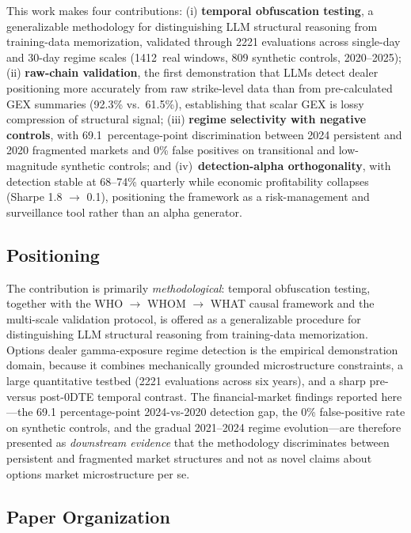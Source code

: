 \documentclass[jrfm,article,accept,moreauthors,pdftex]{Definitions/mdpi}
\begin{document}
This work makes four contributions: (i) \textbf{temporal obfuscation testing}, a generalizable methodology for distinguishing LLM structural reasoning from training-data memorization, validated through 2221 evaluations across single-day and 30-day regime scales (1412~real windows, 809 synthetic controls, 2020--2025); (ii) \textbf{raw-chain validation}, the first demonstration that LLMs detect dealer positioning more accurately from raw strike-level data than from pre-calculated GEX summaries (92.3\% vs.\ 61.5\%), establishing that scalar GEX is lossy compression of structural signal; (iii) \textbf{regime selectivity with negative controls}, with 69.1~percentage-point discrimination between 2024 persistent and 2020 fragmented markets and 0\% false positives on transitional and low-magnitude synthetic controls; and (iv)~\textbf{detection-alpha orthogonality}, with detection stable at 68--74\% quarterly while economic profitability collapses (Sharpe 1.8 $\rightarrow$ 0.1), positioning the framework as a risk-management and surveillance tool rather than an alpha generator.

\subsection{Positioning}
\label{sec:introduction:positioning}

The contribution is primarily \textit{methodological}: temporal obfuscation testing, together with the WHO $\rightarrow$ WHOM $\rightarrow$ WHAT causal framework and the multi-scale validation protocol, is offered as a generalizable procedure for distinguishing LLM structural reasoning from training-data memorization. Options dealer gamma-exposure regime detection is the empirical demonstration domain, because it combines mechanically grounded microstructure constraints, a large quantitative testbed (2221 evaluations across six years), and a sharp pre- versus post-0DTE temporal contrast. The financial-market findings reported here---the 69.1 percentage-point 2024-vs-2020 detection gap, the 0\% false-positive rate on synthetic controls, and the gradual 2021--2024 regime evolution---are therefore presented as \textit{downstream evidence} that the methodology discriminates between persistent and fragmented market structures and not as novel claims about options market microstructure per se.

\subsection{Paper Organization}
\end{document}
